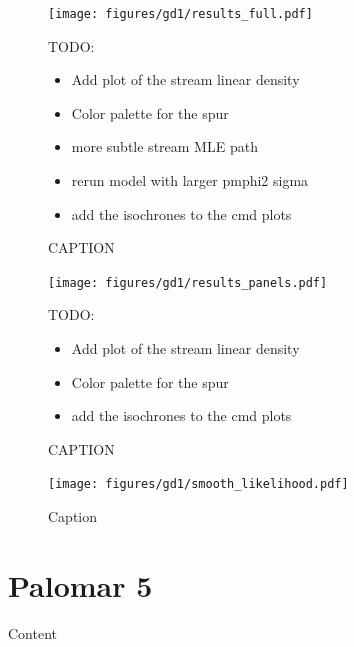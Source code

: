 \documentclass[twocolumn]{aastex631}
\begin{document}
        \begin{figure}[h]
            \centering
            \texttt{[image: figures/gd1/results\_full.pdf]}
            \caption{CAPTION}
            TODO:
            \begin{itemize}
                \item Add plot of the stream linear density
                \item Color palette for the spur
                \item more subtle stream MLE path
                \item rerun model with larger pmphi2 sigma
                \item add the isochrones to the cmd plots
            \end{itemize}
            \label{fig:gd1-results-full}
        \end{figure}

        \begin{figure}[h]
            \centering
            \texttt{[image: figures/gd1/results\_panels.pdf]}
            \caption{CAPTION}
            TODO:
            \begin{itemize}
                \item Add plot of the stream linear density
                \item Color palette for the spur
                \item add the isochrones to the cmd plots
            \end{itemize}
            \label{fig:gd1-results-panels}
        \end{figure}

        \begin{figure}
            \centering
            \texttt{[image: figures/gd1/smooth\_likelihood.pdf]}
            \caption{Caption}
            \label{fig:gd1-heatmap}
        \end{figure}




\section{Palomar 5} \label{sec:results_pal5}

    Content
\end{document}
